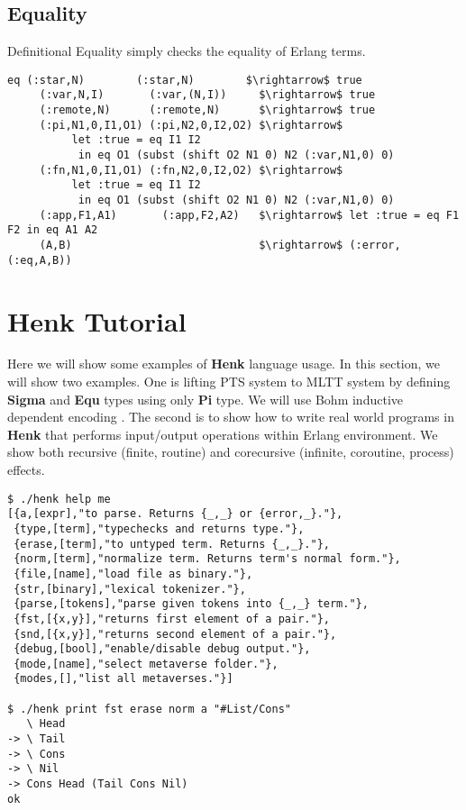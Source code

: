 \documentclass{article}
\begin{document}
\newpage
\subsection{Equality}
Definitional Equality simply checks the equality of Erlang terms.

\begin{lstlisting}[mathescape=true]
  eq (:star,N)        (:star,N)        $\rightarrow$ true
     (:var,N,I)       (:var,(N,I))     $\rightarrow$ true
     (:remote,N)      (:remote,N)      $\rightarrow$ true
     (:pi,N1,0,I1,O1) (:pi,N2,0,I2,O2) $\rightarrow$
          let :true = eq I1 I2
           in eq O1 (subst (shift O2 N1 0) N2 (:var,N1,0) 0)
     (:fn,N1,0,I1,O1) (:fn,N2,0,I2,O2) $\rightarrow$
          let :true = eq I1 I2
           in eq O1 (subst (shift O2 N1 0) N2 (:var,N1,0) 0)
     (:app,F1,A1)       (:app,F2,A2)   $\rightarrow$ let :true = eq F1 F2 in eq A1 A2
     (A,B)                             $\rightarrow$ (:error,(:eq,A,B))
\end{lstlisting}

\section{Henk Tutorial}

Here we will show some examples of {\bf Henk} language usage.
In this section, we will show two examples.
One is lifting PTS system to MLTT system by defining {\bf Sigma} and {\bf Equ} types using only {\bf Pi} type.
We will use Bohm inductive dependent encoding \cite{Bohm85}.
The second is to show how to write real world programs in {\bf Henk} that performs input/output operations within Erlang environment.
We show both recursive (finite, routine) and corecursive (infinite, coroutine, process) effects.

\begin{lstlisting}
$ ./henk help me
[{a,[expr],"to parse. Returns {_,_} or {error,_}."},
 {type,[term],"typechecks and returns type."},
 {erase,[term],"to untyped term. Returns {_,_}."},
 {norm,[term],"normalize term. Returns term's normal form."},
 {file,[name],"load file as binary."},
 {str,[binary],"lexical tokenizer."},
 {parse,[tokens],"parse given tokens into {_,_} term."},
 {fst,[{x,y}],"returns first element of a pair."},
 {snd,[{x,y}],"returns second element of a pair."},
 {debug,[bool],"enable/disable debug output."},
 {mode,[name],"select metaverse folder."},
 {modes,[],"list all metaverses."}]

$ ./henk print fst erase norm a "#List/Cons"
   \ Head
-> \ Tail
-> \ Cons
-> \ Nil
-> Cons Head (Tail Cons Nil)
ok
\end{lstlisting}
\end{document}
